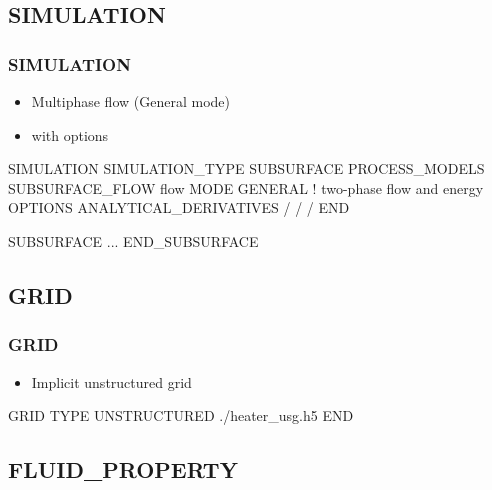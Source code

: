 \documentclass{beamer}
\begin{document}
\subsection{SIMULATION}

\begin{frame}[fragile]\frametitle{SIMULATION}

\begin{itemize}
  \item Multiphase flow (General mode)
  \item with options
\end{itemize}

\begin{semiverbatim}\small
SIMULATION
  SIMULATION_TYPE SUBSURFACE
  PROCESS_MODELS
    SUBSURFACE_FLOW flow
      MODE GENERAL ! two-phase flow and energy
      OPTIONS
        ANALYTICAL_DERIVATIVES
      /   
    /   
  /
END

SUBSURFACE
...
END_SUBSURFACE
\end{semiverbatim}

\end{frame}

\subsection{GRID}

\begin{frame}[fragile]\frametitle{GRID}

\begin{itemize}
  \item Implicit unstructured grid 
\end{itemize}

\begin{semiverbatim}
GRID
  TYPE UNSTRUCTURED ./heater_usg.h5
END
\end{semiverbatim}

\end{frame}

\subsection{FLUID\_PROPERTY}
\end{document}
